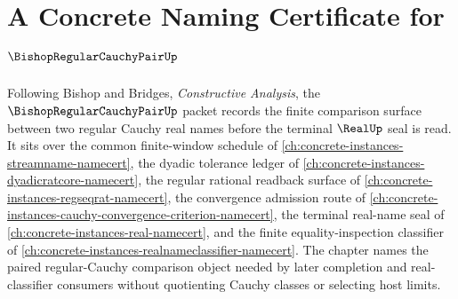 \chapter{A Concrete Naming Certificate for $\BishopRegularCauchyPairUp$}
\label{ch:concrete-instances-bishopregularcauchypair-namecert}

Following Bishop and Bridges, \emph{Constructive Analysis}, the $\BishopRegularCauchyPairUp$ packet records the finite comparison surface between two regular Cauchy real names before the terminal $\RealUp$ seal is read. It sits over the common finite-window schedule of \autoref{ch:concrete-instances-streamname-namecert}, the dyadic tolerance ledger of \autoref{ch:concrete-instances-dyadicratcore-namecert}, the regular rational readback surface of \autoref{ch:concrete-instances-regseqrat-namecert}, the convergence admission route of \autoref{ch:concrete-instances-cauchy-convergence-criterion-namecert}, the terminal real-name seal of \autoref{ch:concrete-instances-real-namecert}, and the finite equality-inspection classifier of \autoref{ch:concrete-instances-realnameclassifier-namecert}. The chapter names the paired regular-Cauchy comparison object needed by later completion and real-classifier consumers without quotienting Cauchy classes or selecting host limits.

